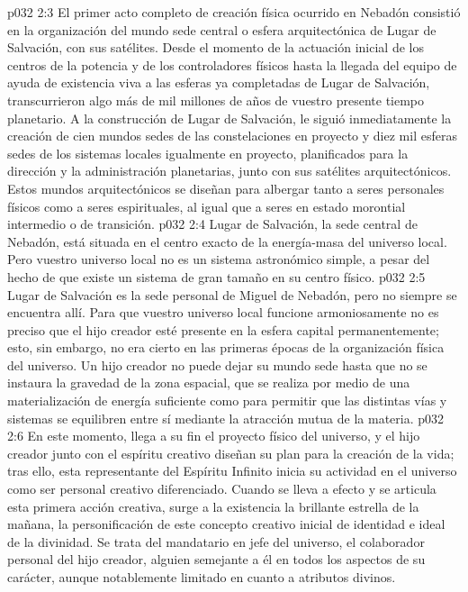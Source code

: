 \vs p032 2:3 \pc El primer acto completo de creación física ocurrido en Nebadón consistió en la organización del mundo sede central o esfera arquitectónica de Lugar de Salvación, con sus satélites. Desde el momento de la actuación inicial de los centros de la potencia y de los controladores físicos hasta la llegada del equipo de ayuda de existencia viva a las esferas ya completadas de Lugar de Salvación, transcurrieron algo más de mil millones de años de vuestro presente tiempo planetario. A la construcción de Lugar de Salvación, le siguió inmediatamente la creación de cien mundos sedes de las constelaciones en proyecto y diez mil esferas sedes de los sistemas locales igualmente en proyecto, planificados para la dirección y la administración planetarias, junto con sus satélites arquitectónicos. Estos mundos arquitectónicos se diseñan para albergar tanto a seres personales físicos como a seres espirituales, al igual que a seres en estado morontial intermedio o de transición.
\vs p032 2:4 Lugar de Salvación, la sede central de Nebadón, está situada en el centro exacto de la energía\hyp{}masa del universo local. Pero vuestro universo local no es un sistema astronómico simple, a pesar del hecho de que existe un sistema de gran tamaño en su centro físico.
\vs p032 2:5 Lugar de Salvación es la sede personal de Miguel de Nebadón, pero no siempre se encuentra allí. Para que vuestro universo local funcione armoniosamente no es preciso que el hijo creador esté presente en la esfera capital permanentemente; esto, sin embargo, no era cierto en las primeras épocas de la organización física del universo. Un hijo creador no puede dejar su mundo sede hasta que no se instaura la gravedad de la zona espacial, que se realiza por medio de una materialización de energía suficiente como para permitir que las distintas vías y sistemas se equilibren entre sí mediante la atracción mutua de la materia.
\vs p032 2:6 \pc En este momento, llega a su fin el proyecto físico del universo, y el hijo creador junto con el espíritu creativo diseñan su plan para la creación de la vida; tras ello, esta representante del Espíritu Infinito inicia su actividad en el universo como ser personal creativo diferenciado. Cuando se lleva a efecto y se articula esta primera acción creativa, surge a la existencia la brillante estrella de la mañana, la personificación de este concepto creativo inicial de identidad e ideal de la divinidad. Se trata del mandatario en jefe del universo, el colaborador personal del hijo creador, alguien semejante a él en todos los aspectos de su carácter, aunque notablemente limitado en cuanto a atributos divinos.
